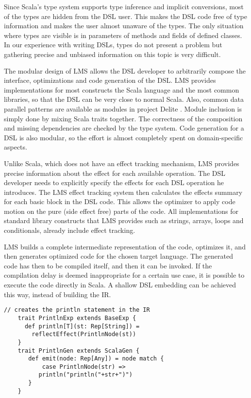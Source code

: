 Since Scala's type system supports type inference and implicit conversions, most
of the  types are hidden from the DSL user. This makes the DSL code
free of type information and makes the user almost unaware of the 
types. The only situation where  types are visible is in
parameters of methods and fields of defined classes. In our experience
with writing DSLs,  types do not present a problem but gathering
precise and unbiased information on this topic is very difficult.

The modular design of LMS allows the DSL developer to arbitrarily compose the
interface, optimizations and code generation of the DSL. LMS provides
implementations for most constructs the Scala language and the most common
libraries, so that the DSL can be very close to normal Scala. Also, common data
parallel patterns are available as modules in project Delite \cite{dsl11}.
Module inclusion is simply done by mixing Scala traits together. The correctness
of the composition and missing dependencies are checked by the type system. Code
generation for a DSL is also modular, so the effort is almost completely spent
on domain-specific aspects.

Unlike Scala, which does not have an effect tracking mechanism, LMS provides
precise information about the effect for each available operation. The DSL
developer needs to explicitly specify the effects for each DSL operation he
introduces. The LMS effect tracking system then calculates the effects summary
for each basic block in the DSL code. This allows the optimizer to apply code
motion on the pure (side effect free) parts of the code. All implementations for
standard library constructs that LMS provides such as strings, arrays, loops and
conditionals, already include effect tracking.

LMS builds a complete intermediate representation of the code, optimizes it, and
then generates optimized code for the chosen target language. The generated code
has then to be compiled itself, and then it can be invoked. If the compilation
delay is deemed inappropriate for a certain use case, it is possible to execute
the code directly in Scala. A shallow DSL embedding can be achieved this way,
instead of building the IR.

\begin{lstlisting}[name=code, caption=Example of how the DSL module is specified. This module is used for measuring a performance of a block of code and can be reused in any other Scala backed DSL. ,captionpos=b, label=lst:println_dsl, float=t]
    // creates the println statement in the IR
    trait PrintlnExp extends BaseExp {
      def println[T](st: Rep[String]) =
        reflectEffect(PrintlnNode(st)) 
    }
    trait PrintlnGen extends ScalaGen {
       def emit(node: Rep[Any]) = node match {
           case PrintlnNode(str) =>
	      println("println("+str+")")
       }
    }
\end{lstlisting}

